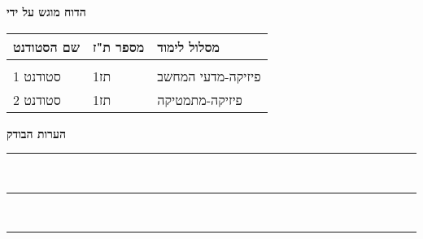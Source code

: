 \noindent
{\Large \textbf{הדוח מוגש על ידי}} \\[15pt]
\begin{tabular}{@{}p{3.5cm}p{2.5cm}p{5cm}@{}}
\textbf{שם הסטודנט} & \textbf{מספר ת"ז} & \textbf{מסלול לימוד} \\[5pt]
\hline \\[-3pt]
סטודנט 1 & תז1 & פיזיקה-מדעי המחשב \\[8pt]
סטודנט 2 & תז1 & פיזיקה-מתמטיקה \\[5pt]
\end{tabular}

\vspace{25pt}
\noindent
{\Large \textbf{הערות הבודק}} \\[15pt]
\rule{\textwidth}{0.5pt} \\[8pt]
\rule{\textwidth}{0.5pt} \\[8pt]
\rule{\textwidth}{0.5pt} \\[8pt]
\newpage 